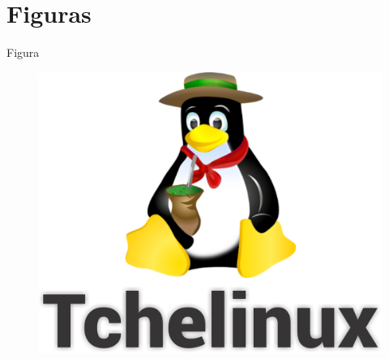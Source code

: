 \documentclass[aspectratio=1610]{beamer}
\begin{document}
	\section{Figuras}

	\begin{frame}{Figura}
	
		\begin{figure}[!htb]
			\centering
			\includegraphics[scale=.5]{fig/eventLogo.png}
		\end{figure}
	
	\end{frame}
\end{document}
